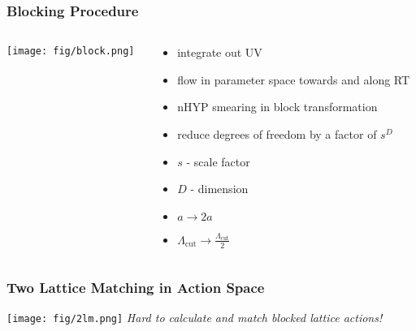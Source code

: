   \begin{frame}
    \frametitle{Blocking Procedure}
    \begin{columns}[T]
      \begin{column}{.5\textwidth}
        \begin{block}{}
          \texttt{[image: fig/block.png]}
        \end{block}
      \end{column}
      \begin{column}{.5\textwidth}
        \begin{block}{}
          \begin{itemize}
            \item integrate out UV
            \item flow in parameter space towards and along RT
            \item nHYP smearing in block transformation
            \vspace{12pt}
            \item reduce degrees of freedom by a factor of $s^D$
            \item $s$ - scale factor
            \item $D$ - dimension
            \item $a \rightarrow 2a$
            \item $\Lambda_{\text{cut}} \rightarrow \tfrac{\Lambda_{\text{cut}}}{2}$
          \end{itemize}
        \end{block}
      \end{column}
    \end{columns}
  \end{frame}

  \begin{frame}
    \frametitle{Two Lattice Matching in Action Space}
    \centering
    \texttt{[image: fig/2lm.png]}
    \newline
    \vspace{12pt}
    \emph{Hard to calculate and match blocked lattice actions!}
  \end{frame}

